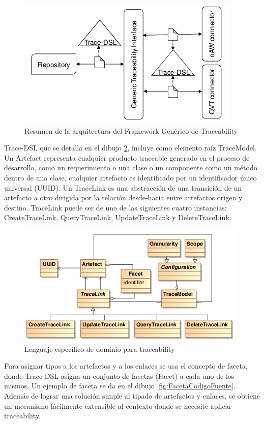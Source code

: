 \documentclass[a4paper,12pt,oneside]{book}
\begin{document}
\begin{figure}[hbtp]
\centering
\includegraphics[scale=.7]{./img/GenericTraceFrame_Arquitectura}
\caption{Resumen de la arquitectura del Framework Genérico de Traceability}
\label{fig:GenericoArquitectura}
\end{figure}


Trace-DSL que se detalla en el dibujo \ref{fig:DSLTrace}, incluye como elemento raíz TraceModel. Un Artefact representa cualquier producto traceable generado en el proceso de desarrollo, como un requerimiento o una clase o un componente como un método dentro de una clase, cualquier artefacto es identificado por un identificador único universal (UUID). Un TraceLink es una abstracción de una transición de un artefacto a otro dirigida por la relación desde-hacia entre artefactos origen y destino. TraceLink puede ser de uno de las siguientes cuatro instancias: CreateTraceLink, QueryTraceLink, UpdateTraceLink y DeleteTraceLink.


\begin{figure}[hbtp]
\centering
\includegraphics[scale=.8]{./img/Trace-DSL}
\caption{Lenguaje específico de dominio para traceability}
\label{fig:DSLTrace}
\end{figure}

Para asignar tipos a los artefactos y a los enlaces se usa el concepto de faceta, donde Trace-DSL asigna un conjunto de facetas (Facet) a cada uno de los mismos. Un ejemplo de faceta se da en el dibujo \ref{fig:FacetaCodigoFuente}. Además de lograr una solución simple al tipado de artefactos y enlaces, se obtiene un mecanismo fácilmente extensible al contexto donde se necesite aplicar traceability.
\end{document}
